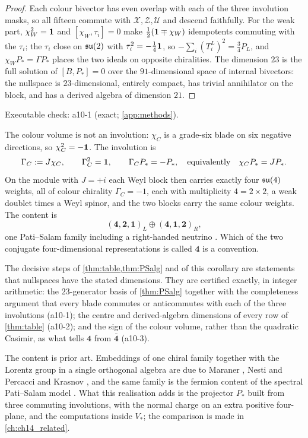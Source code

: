 \begin{proof}
Each colour bivector has even overlap with each of the three involution masks, so all fifteen commute with $\mathcal X,\mathcal Z,\mathcal U$ and descend
faithfully. For the weak part, $\chi_W^2=\mathbf 1$ and $[\chi_W,\tau_i]=0$ make $\tfrac12(\mathbf 1\mp\chi_W)$ idempotents commuting with the
$\tau_i$; the $\tau_i$ close on $\mathfrak{su}(2)$ with $\tau_i^2=-\tfrac14\mathbf 1$, so $-\sum_i(T^L_i)^2=\tfrac34P_L$, and $\chi_WP_*=\Gamma P_*$ places the
two ideals on opposite chiralities. The dimension $23$ is the full solution of $[B,P_*]=0$ over the $91$-dimensional space of internal
bivectors: the nullspace is $23$-dimensional, entirely compact, has trivial annihilator on the block, and has a derived algebra of
dimension $21$.
\end{proof}

\noindent Executable check: a10-1 (exact; \cref{app:methods}).

\begin{corollary}
\label{cor:PSfamily}
The colour volume is not an involution: $\chi_C$ is a grade-six blade on six negative directions, so $\chi_C^2=-\mathbf 1$. The
involution is
\[
\Gamma_C:=J\chi_C,\qquad \Gamma_C^2=\mathbf 1,\qquad \Gamma_CP_*=-P_*,\quad\text{equivalently}\quad \chi_CP_*=JP_*.
\]
On the module with $J=+i$ each Weyl block then carries exactly four $\mathfrak{su}(4)$ weights, all of colour chirality $\Gamma_C=-1$, each with
multiplicity $4=2\times2$, a weak doublet times a Weyl spinor, and the two blocks carry the same colour weights. The content is
\[
(\mathbf4,\mathbf2,\mathbf1)_L\oplus(\mathbf4,\mathbf1,\mathbf2)_R ,
\]
one Pati--Salam family including a right-handed neutrino \cite{PatiSalam}. Which of the two conjugate four-dimensional representations
is called $\mathbf4$ is a convention.
\end{corollary}

The decisive steps of \cref{thm:table,thm:PSalg} and of this corollary are statements that nullspaces have the stated dimensions. They are
certified exactly, in integer arithmetic: the $23$-generator basis of \cref{thm:PSalg} together with the completeness argument that every
blade commutes or anticommutes with each of the three involutions (a10-1); the centre and derived-algebra dimensions of every row of
\cref{thm:table} (a10-2); and the sign of the colour volume, rather than the quadratic Casimir, as what tells $\mathbf4$ from $\bar{\mathbf4}$
(a10-3).

The content is prior art. Embeddings of one chiral family together with the Lorentz group in a single orthogonal algebra are due to Maraner
\cite{Maraner04}, Nesti and Percacci \cite{NestiPercacci10} and Krasnov \cite[\S\S6.4--6.7]{Krasnov18}, and the same family is the fermion
content of the spectral Pati--Salam model \cite{ChamseddineConnesVanSuijlekom13}. What this realisation adds is the projector $P_*$ built from
three commuting involutions, with the normal charge on an extra positive four-plane, and the computations inside $V_*$; the comparison is
made in \cref{ch:ch14_related}.

